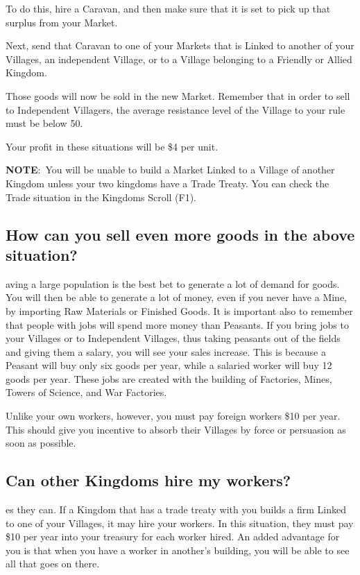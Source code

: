To do this, hire a Caravan, and then make sure that it is set to pick up that surplus from your Market.

Next, send that Caravan to one of your Markets that is Linked to another of your Villages, an independent Village, or to a Village belonging to a Friendly or Allied Kingdom.

Those goods will now be sold in the new Market. Remember that in order to sell to Independent Villagers, the average resistance level of the Village to your rule must be below 50.

Your profit in these situations will be \$4 per unit.

\textbf{NOTE}: You will be unable to build a Market Linked to a Village of another Kingdom unless your two kingdoms have a Trade Treaty. You can check the Trade situation in the Kingdoms Scroll (F1).

\subsection{How can you sell even more goods in the above situation?}

aving a large population is the best bet to generate a lot of demand for goods. You will then be able to generate a lot of money, even if you never have a Mine, by importing Raw Materials or Finished Goods. It is important also to remember that people with jobs will spend more money than Peasants. If you bring jobs to your Villages or to Independent Villages, thus taking peasants out of the fields and giving them a salary, you will see your sales increase. This is because a Peasant will buy only six goods per year, while a salaried worker will buy 12 goods per year. These jobs are created with the building of Factories, Mines, Towers of Science, and War Factories.

Unlike your own workers, however, you must pay foreign workers \$10 per year. This should give you incentive to absorb their Villages by force or persuasion as soon as possible.

\subsection{Can other Kingdoms hire my workers?}

es they can. If a Kingdom that has a trade treaty with you builds a firm Linked to one of your Villages, it may hire your workers. In this situation, they must pay \$10 per year into your treasury for each worker hired. An added advantage for you is that when you have a worker in another’s building, you will be able to see all that goes on there.